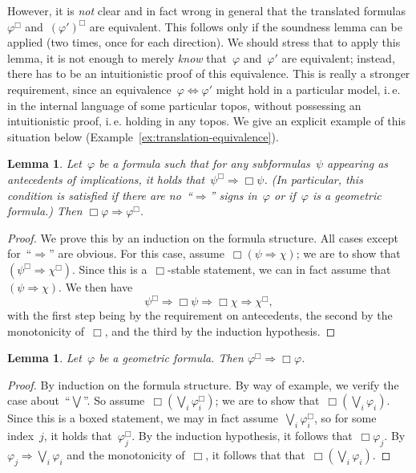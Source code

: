 \documentclass[10pt]{amsart}
\makeatletter
\theoremstyle{definition}
\theoremstyle{plain}
\newtheorem{lemma}[defn]{Lemma}
\theoremstyle{remark}
\newcommand{\?}{\,{:}\,}
\renewcommand{\_}{\mathpunct{.}\,}
\newcommand{\ie}{i.\,e.\@\xspace}
\makeatother
\begin{document}
However, it is \emph{not} clear and in fact wrong in general that the translated formulas~$\varphi^\Box$
and~$(\varphi')^\Box$ are equivalent. This follows only if the soundness
lemma can be applied (two times, once for each direction). We should stress that to apply this
lemma, it is not enough to merely \emph{know} that~$\varphi$ and~$\varphi'$ are
equivalent; instead, there has to be an intuitionistic proof of this
equivalence. This is really a stronger requirement, since an
equivalence~$\varphi \Leftrightarrow \varphi'$ might
hold in a particular model, \ie in the internal language of some particular
topos, without possessing an intuitionistic proof, \ie holding in any topos. We
give an explicit example of this situation below
(Example~\ref{ex:translation-equivalence}).

\begin{lemma}\label{lemma:open-stalk}
Let~$\varphi$ be a formula such that for any subformulas~$\psi$
appearing as antecedents of implications, it holds that~$\psi^\Box \Rightarrow
\Box\psi$. (In particular, this condition is satisfied if there are
no~``$\Rightarrow$'' signs in~$\varphi$ or if~$\varphi$ is a geometric formula.) Then $\Box\varphi \Rightarrow
\varphi^\Box$.\end{lemma}
\begin{proof}We prove this by an induction on the formula structure. All cases
except for~``$\Rightarrow$'' are obvious. For this case, assume~$\Box(\psi
\Rightarrow \chi)$; we are to show that~$(\psi^\Box \Rightarrow \chi^\Box)$.
Since this is a~$\Box$-stable statement, we can in fact assume that~$(\psi
\Rightarrow \chi)$. We then have
\[ \psi^\Box \Longrightarrow \Box\psi \Longrightarrow \Box\chi
\Longrightarrow \chi^\Box, \]
with the first step being by the requirement on antecedents, the second by the
monotonicity of~$\Box$, and the third by the induction hypothesis.
\end{proof}

\begin{lemma}\label{lemma:stalk-open}
Let~$\varphi$ be a geometric formula.
Then $\varphi^\Box \Rightarrow \Box\varphi$.\end{lemma}
\begin{proof}By induction on the formula structure. By way of example, we verify
the case about~``$\bigvee$''. So assume~$\Box(\bigvee_i \varphi_i^\Box)$; we are
to show that~$\Box(\bigvee_i \varphi_i)$. Since this is a boxed statement, we
may in fact assume~$\bigvee_i \varphi_i^\Box$, so for some index~$j$, it holds
that~$\varphi_j^\Box$. By the induction hypothesis, it follows
that~$\Box\varphi_j$. By~$\varphi_j \Rightarrow \bigvee_i \varphi_i$ and the
monotonicity of~$\Box$, it follows that that~$\Box(\bigvee_i \varphi_i)$.
\end{proof}
\end{document}
